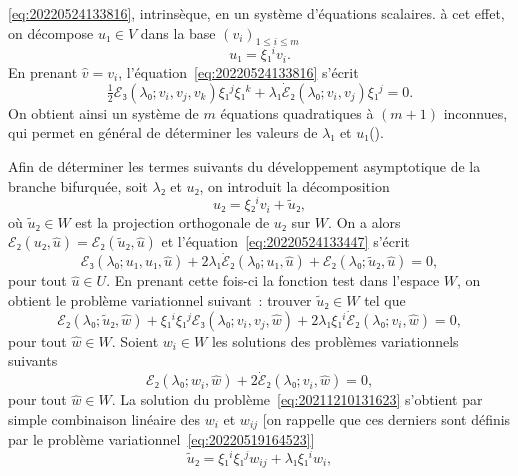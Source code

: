 \documentclass[12pt, final]{scrartcl}
\theoremstyle{definition}
\begin{document}
\eqref{eq:20220524133816}, intrinsèque, en un système d'équations scalaires. à
cet effet, on décompose \(u₁∈V\) dans la base \((v_i)_{1 ≤ i ≤ m}\)
\begin{equation}
  \label{eq:20220524133944}
  u₁ = ξ₁^i v_i.
\end{equation}
En prenant \(\hat{v} = v_i\), l'équation~\eqref{eq:20220524133816} s'écrit
\begin{equation}
  \label{eq:20220524134121}
  \tfrac{1}{2} ℰ₃(λ₀; v_i, v_j, v_k)ξ₁^j ξ₁^k + λ₁ \dot{ℰ}₂(λ₀; v_i, v_j) ξ₁^j = 0.
\end{equation}
On obtient ainsi un système de \(m\) équations quadratiques à \((m + 1)\)
inconnues, qui permet en général de déterminer les valeurs de \(λ₁\) et
\(u₁\)().

Afin de déterminer les termes suivants du développement asymptotique de la
branche bifurquée, soit \(λ₂\) et \(u₂\), on introduit la décomposition
\begin{equation}
  u₂ = ξ₂^i v_i + \tilde{u}₂,
\end{equation}
où \(\tilde{u}₂∈W\) est la projection orthogonale de \(u₂\) sur \(W\). On a
alors \(ℰ₂(u₂, \hat{u}) =ℰ₂(\tilde{u}₂, \hat{u})\) et
l'équation~\eqref{eq:20220524133447} s'écrit
\begin{equation}
 ℰ₃(λ₀; u₁, u₁, \hat{u}) + 2λ₁ \dot{ℰ}₂(λ₀; u₁, \hat{u}) + ℰ₂(λ₀; \tilde{u}₂, \hat{u}) = 0,
\end{equation}
pour tout \(\hat{u}∈U\). En prenant cette fois-ci la fonction test dans l'espace
\(W\), on obtient le problème variationnel suivant~: trouver \(\tilde{u}₂∈W\)
tel que
\begin{equation}
  \label{eq:20211210131623}
  ℰ₂(λ₀; \tilde{u}₂, \hat{w}) + ξ₁^i ξ₁^j ℰ₃(λ₀; v_i, v_j, \hat{w}) + 2λ₁ ξ₁^i \dot{ℰ}₂(λ₀; v_i, \hat{w}) = 0,
\end{equation}
pour tout \(\hat{w}∈W\). Soient \(w_i∈W\) les solutions des problèmes
variationnels suivants
\begin{equation}
  \label{eq:20220524134525}
  ℰ₂(λ₀; w_i, \hat{w}) + 2\dot{ℰ}₂(λ₀; v_i, \hat{w}) = 0,
\end{equation}
pour tout \(\hat{w}∈W\). La solution du problème~\eqref{eq:20211210131623}
s'obtient par simple combinaison linéaire des \(w_i\) et \(w_{ij}\) [on rappelle
que ces derniers sont définis par le problème
variationnel~\eqref{eq:20220519164523}]
\begin{equation}
 \tilde{u}₂ = ξ₁^i ξ₁^j w_{ij} + λ₁ ξ₁^i w_i,
\end{equation}
\end{document}

